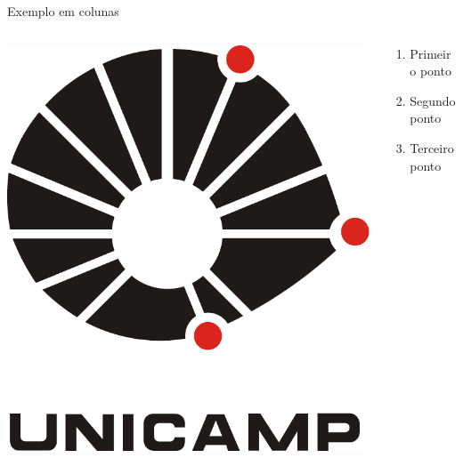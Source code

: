 \documentclass[10pt, aspectratio=169]{beamer}
\begin{document}
\begin{frame}{Exemplo em colunas}

\begin{columns}
\begin{column}[c]{0.5\textwidth}
\centering\includegraphics[width=0.8\hsize]{unicamp-logo}
\end{column}

\begin{column}[c]{0.5\textwidth}
\begin{enumerate}
\item Primeiro ponto
\item Segundo ponto
\item Terceiro ponto
\end{enumerate}
\end{column}
\end{columns}

\end{frame}
\end{document}
